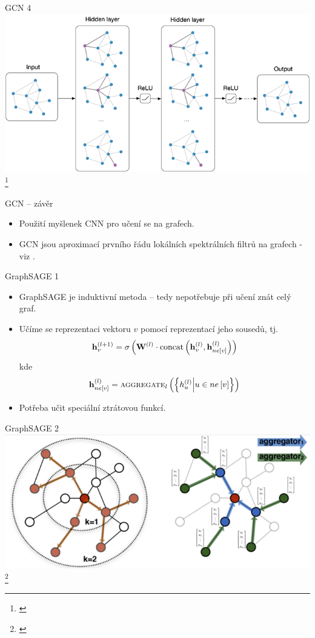 \documentclass[10pt]{beamer}
\newcommand{\mathvec}{\ensuremath{\mathbf}}
\newcommand{\mathmat}{\ensuremath{\mathbf}}
\begin{document}
\begin{frame}{GCN 4}
	\centering
	\includegraphics[width=0.8\pagewidth]{images/GCN.png}\footnote{\cite{kipf_how_2016}}
\end{frame}

\begin{frame}{GCN -- závěr}
	\begin{itemize}
		\item Použití myšlenek CNN pro učení se na grafech.
		\item GCN jsou aproximací prvního řádu lokálních spektrálních filtrů na grafech - viz \cite{kipf_semi-supervised_2017}.
	\end{itemize}
\end{frame}

\begin{frame}{GraphSAGE 1}
	\begin{itemize}
		\item GraphSAGE je induktivní metoda -- tedy nepotřebuje při učení znát celý graf.
		\item Učíme se reprezentaci vektoru \( v \) pomocí reprezentací jeho sousedů, tj.
			\[ \mathvec{h}_v^{(l + 1)} = \sigma \left( \mathmat{W}^{(l)} \cdot \mathrm{concat} \left( \mathvec{h}_v^{(l)}, \mathvec{h}_{ne \left[ v \right]}^{(l)} \right) \right) \]
			kde
			\[ \mathvec{h}_{ne \left[ v \right]}^{(l)} = \textsc{aggregate}_l \left( \left\{ h_u^{(l)} \middle| u \in ne \left[ v \right] \right\} \right) \]
		\item Potřeba učit speciální ztrátovou funkcí.
	\end{itemize}
\end{frame}

\begin{frame}{GraphSAGE 2}
	\centering
	\includegraphics[width=0.7\pagewidth]{images/GraphSAGE.png}\footnote{\cite{hamilton_inductive_2017}}
\end{frame}
\end{document}
